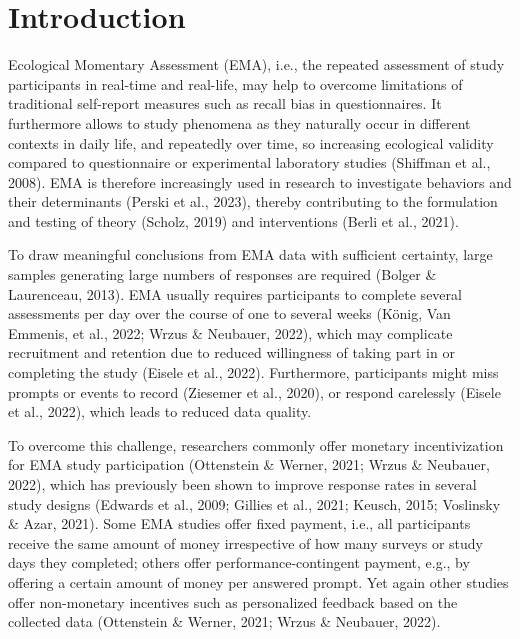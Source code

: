 \documentclass[authordate, empirical]{jote-new-article}
\begin{document}
	\section{\textbf{Introduction}}



	Ecological Momentary Assessment (EMA), i.e., the repeated assessment of study participants in real-time and real-life, may help to overcome limitations of traditional self-report measures such as recall bias in questionnaires. It furthermore allows to study phenomena as they naturally occur in different contexts in daily life, and repeatedly over time, so increasing ecological validity compared to questionnaire or experimental laboratory studies (Shiffman et al., 2008). EMA is therefore increasingly used in research to investigate behaviors and their determinants (Perski et al., 2023), thereby contributing to the formulation and testing of theory (Scholz, 2019) and interventions (Berli et al., 2021).



	To draw meaningful conclusions from EMA data with sufficient certainty, large samples generating large numbers of responses are required (Bolger \& Laurenceau, 2013). EMA usually requires participants to complete several assessments per day over the course of one to several weeks (König, Van Emmenis, et al., 2022; Wrzus \& Neubauer, 2022), which may complicate recruitment and retention due to reduced willingness of taking part in or completing the study (Eisele et al., 2022). Furthermore, participants might miss prompts or events to record (Ziesemer et al., 2020), or respond carelessly (Eisele et al., 2022), which leads to reduced data quality.



	To overcome this challenge, researchers commonly offer monetary incentivization for EMA study participation (Ottenstein \& Werner, 2021; Wrzus \& Neubauer, 2022), which has previously been shown to improve response rates in several study designs (Edwards et al., 2009; Gillies et al., 2021; Keusch, 2015; Voslinsky \& Azar, 2021). Some EMA studies offer fixed payment, i.e., all participants receive the same amount of money irrespective of how many surveys or study days they completed; others offer performance-contingent payment, e.g., by offering a certain amount of money per answered prompt. Yet again other studies offer non-monetary incentives such as personalized feedback based on the collected data (Ottenstein \& Werner, 2021; Wrzus \& Neubauer, 2022).
\end{document}
